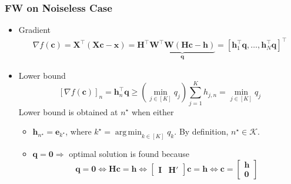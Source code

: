 \documentclass[10pt,xcolor={usenames,dvipsnames,table}]{beamer}
\newcommand{\T}{\!\top\!}
\DeclareMathOperator*{\argmin}{arg\,min}
\begin{document}
\begin{frame}
    \frametitle{FW on Noiseless Case}
    \begin{itemize}
        \item Gradient
    \begin{align*}
        \nabla f(\mathbf{c}) 
        =\bm{X}^{\T} (\bm{X}\bm{c} -\bm{x}) 
        = \bm{H}^{\T} \underbrace{\bm{W}^{\T}\bm{W} (\bm{H}\bm{c} - \bm{h}) }_{\bm{q}} 
        = [\bm{h}_1^{\T}\bm{q}, \ldots , \bm{h}_N^{\T}\bm{q}]^{\T}
    \end{align*}
    \item Lower bound
    \[
        [\nabla f(\bm{c})]_n =\bm{h}_n^{\T}\bm{q}
        \geq \left( \min_{j\in[ K]} q_{j} \right)  \sum^{K}_{j=1} h_{j,n} 
        = \min_{j\in[ K]} q_{j}
    \]
    Lower bound is obtained at $n^{\star}$ when either
    \begin{itemize}
        \item $\bm{h}_{n^{\star}} = \bm{e}_{k^{\star}}$, where $k^{\star} = \argmin_{k \in [K]} q_k$. By definition, $n^{\star} \in \mathcal{K}$.
        \item $\bm{q} = \bm{0} \Rightarrow$ optimal solution is found because
            \[
            \bm{q} = \bm{0} \Leftrightarrow
            \bm{H}\bm{c} = \bm{h} \Leftrightarrow \begin{bmatrix}
                \bm{I} & \bm{H}'
            \end{bmatrix}  \bm{c} = \bm{h}
            \Leftrightarrow \bm{c} = \begin{bmatrix}
            \bm{h} \\ \bm{0}
            \end{bmatrix} 
            \] 
    \end{itemize}
    \end{itemize}
\end{frame}
\end{document}
